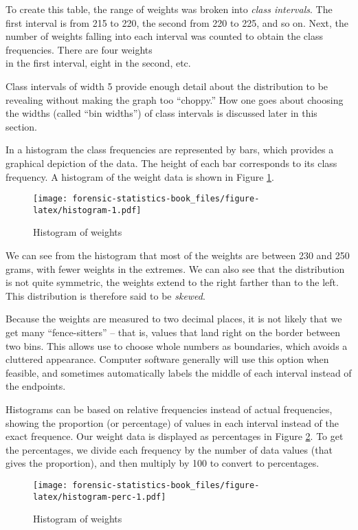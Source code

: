 \documentclass[
]{book}
\begin{document}
To create this table, the range of weights was broken into \emph{class intervals}.
The first interval is from 215 to 220, the second from 220 to 225, and so on. Next, the number of weights
falling into each interval was counted to obtain the class frequencies. There are four weights\\
in the first interval, eight in the second, etc.

Class intervals of width 5 provide enough detail about the distribution to be revealing without
making the graph too ``choppy.'' How one goes about choosing the widths (called ``bin widths'') of
class intervals is discussed later in this section.

In a histogram the class frequencies are represented by bars, which provides a graphical
depiction of the data. The height of each bar corresponds
to its class frequency. A histogram of the weight data is shown in Figure \ref{fig:histogram}.

\begin{figure}
\centering
\texttt{[image: forensic-statistics-book\_files/figure-latex/histogram-1.pdf]}
\caption{\label{fig:histogram}Histogram of weights}
\end{figure}

We can see from the histogram that most of the weights are between 230 and 250 grams,
with fewer weights in the extremes. We can also see that the distribution is not
quite symmetric, the weights extend to the right farther than to the left. This
distribution is therefore said to be \emph{skewed}.

Because the weights are measured to two decimal
places, it is not likely that we get many ``fence-sitters'' -- that is, values
that land right on the border between two bins. This allows use to choose
whole numbers as boundaries, which avoids a cluttered appearance. Computer
software generally will use this option when feasible, and sometimes automatically
labels the middle of each interval instead of the endpoints.

Histograms can be based on relative frequencies instead of actual frequencies,
showing the proportion (or percentage) of values in each interval instead of
the exact frequence. Our weight data is displayed as percentages in
Figure \ref{fig:histogram-perc}. To get the percentages, we divide
each frequency by the number of data values (that gives the proportion), and
then multiply by 100 to convert to percentages.

\begin{figure}
\centering
\texttt{[image: forensic-statistics-book\_files/figure-latex/histogram-perc-1.pdf]}
\caption{\label{fig:histogram-perc}Histogram of weights}
\end{figure}
\end{document}
